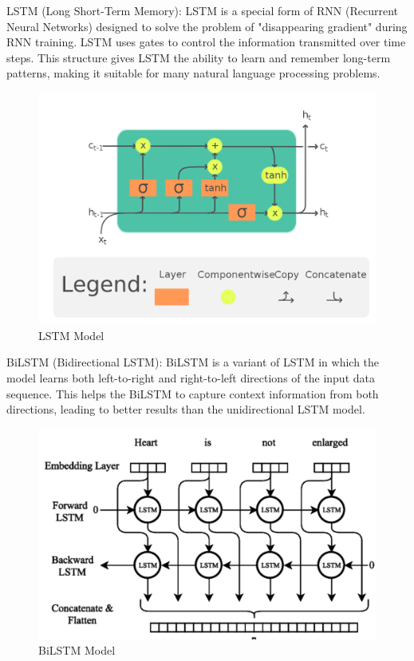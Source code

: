 \documentclass[11pt]{article}
\begin{document}
LSTM (Long Short-Term Memory): LSTM is a special form of RNN (Recurrent Neural Networks) designed to solve the problem of "disappearing gradient" during RNN training. LSTM uses gates to control the information transmitted over time steps. This structure gives LSTM the ability to learn and remember long-term patterns, making it suitable for many natural language processing problems.
\begin{center}
    \begin{figure}[htp]
    \begin{center}
    \includegraphics [scale=0.2] {lstmlt}
    \end{center}
    \caption{LSTM Model}
    \label{refhinh1}
    \end{figure}
\end{center}
BiLSTM (Bidirectional LSTM): BiLSTM is a variant of LSTM in which the model learns both left-to-right and right-to-left directions of the input data sequence. This helps the BiLSTM to capture context information from both directions, leading to better results than the unidirectional LSTM model.
\begin{center}
    \begin{figure}[htp]
    \begin{center}
    \includegraphics [scale=0.3] {bilstmlt}
    \end{center}
    \caption{BiLSTM Model}
    \label{refhinh1}
    \end{figure}
\end{center}
\end{document}
